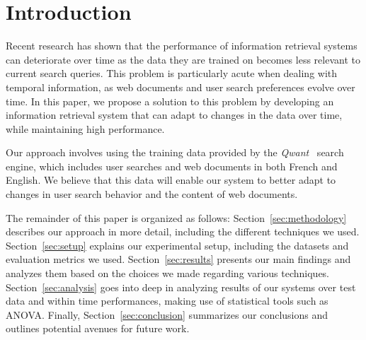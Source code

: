 \section{Introduction}
\label{sec:introduction}

Recent research has shown that the performance of information retrieval systems can deteriorate over time as the data they are trained on becomes less relevant to current search queries. 
This problem is particularly acute when dealing with temporal information, as web documents and user search preferences evolve over time. 
In this paper, we propose a solution to this problem by developing an information retrieval system that can adapt to changes in the data over time, while maintaining high performance.

Our approach involves using the training data provided by the \textit{Qwant}~\cite{qwant} search engine, which includes user searches and web documents in both French and English.
We believe that this data will enable our system to better adapt to changes in user search behavior and the content of web documents.

The remainder of this paper is organized as follows: 
Section~\ref{sec:methodology} describes our approach in more detail, including the different techniques we used. 
Section~\ref{sec:setup} explains our experimental setup, including the datasets and evaluation metrics we used. 
Section~\ref{sec:results} presents our main findings and analyzes them based on the choices we made regarding various techniques. 
Section~\ref{sec:analysis} goes into deep in analyzing results of our systems over test data and within time performances, making use of statistical tools such as ANOVA.
Finally, Section~\ref{sec:conclusion} summarizes our conclusions and outlines potential avenues for future work.